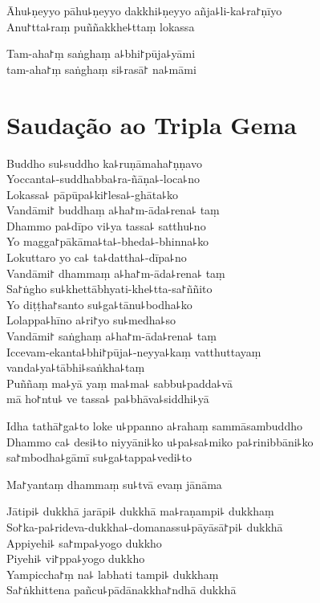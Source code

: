 Āhu꜕ṇeyyo pāhu꜕ṇeyyo dakkhi꜕ṇeyyo añja꜕li-ka꜕ra꜓ṇīyo\\
Anu꜓tta꜕raṃ puññakkhe꜕ttaṃ lokassa

Tam-aha꜓ṃ saṅghaṃ a꜕bhi꜓pūja꜕yāmi\\
\vin tam-aha꜓ṃ saṅghaṃ si꜕rasā꜓ na꜕māmi 

\chapter{Saudação ao Tripla Gema}%

\begin{leader}
\end{leader}

Buddho su꜕suddho ka꜕ruṇāmaha꜓ṇṇavo\\
Yoccanta꜕-suddhabba꜕ra-ñāṇa꜕-loca꜕no\\
Lokassa꜕ pāpūpa꜕ki꜓lesa꜕-ghāta꜕ko\\
Vandāmi꜓ buddhaṃ a꜕ha꜓m-āda꜕rena꜕ taṃ\\
Dhammo pa꜕dīpo vi꜕ya tassa꜕ satthu꜕no\\
Yo magga꜓pākāma꜕ta꜕-bheda꜕-bhinna꜕ko\\
Lokuttaro yo ca꜕ ta꜕dattha꜕-dīpa꜕no\\
Vandāmi꜓ dhammaṃ a꜕ha꜓m-āda꜕rena꜕ taṃ\\
Sa꜓ṅgho su꜕khettābhyati-khe꜕tta-sa꜓ññito\\
Yo diṭṭha꜓santo su꜕ga꜕tānu꜕bodha꜕ko\\
Lolappa꜕hīno a꜕ri꜓yo su꜕medha꜕so\\
Vandāmi꜓ saṅghaṃ a꜕ha꜓m-āda꜕rena꜕ taṃ\\
Iccevam-ekanta꜕bhi꜓pūja꜕-neyya꜕kaṃ vatthuttayaṃ\\
vanda꜕ya꜕tābhi꜕saṅkha꜕taṃ\\
Puññaṃ ma꜕yā yaṃ ma꜕ma꜕ sabbu꜕padda꜕vā\\
\vin mā ho꜓ntu꜕ ve tassa꜕ pa꜕bhāva꜕siddhi꜕yā

Idha tathā꜓ga꜕to loke u꜕ppanno a꜕rahaṃ sammāsambuddho\\
Dhammo ca꜕ desi꜕to niyyāni꜕ko u꜕pa꜕sa꜕miko pa꜕rinibbāni꜕ko\\
\vin sa꜓mbodha꜕gāmī su꜕ga꜕tappa꜕vedi꜕to

Ma꜓yantaṃ dhammaṃ su꜕tvā evaṃ jānāma

Jātipi꜕ dukkhā jarāpi꜕ dukkhā ma꜕raṇampi꜕ dukkhaṃ\\
So꜓ka-pa꜕rideva-dukkha꜕-domanassu꜕pāyāsā꜓pi꜕ dukkhā\\
Appiyehi꜕ sa꜓mpa꜕yogo dukkho\\
Piyehi꜕ vi꜓ppa꜕yogo dukkho\\
Yampiccha꜓ṃ na꜕ labhati tampi꜕ dukkhaṃ\\
Sa꜓ṅkhittena pañcu꜕pādānakkha꜓ndhā dukkhā

